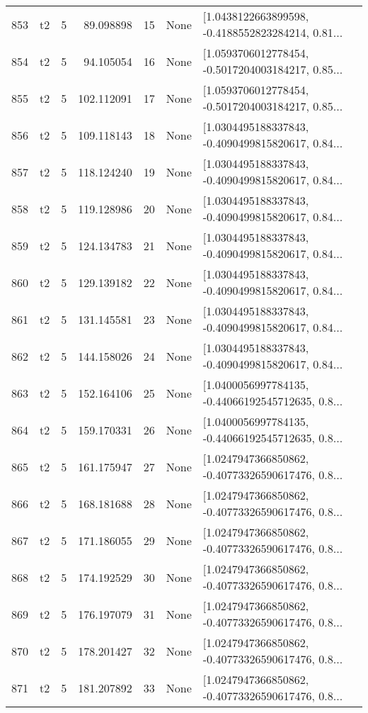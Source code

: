 \begin{tabular}{lllrlll}
853 &  t2 &   5 &    89.098898 &   15 &  None &  [1.0438122663899598, -0.4188552823284214, 0.81... \\
854 &  t2 &   5 &    94.105054 &   16 &  None &  [1.0593706012778454, -0.5017204003184217, 0.85... \\
855 &  t2 &   5 &   102.112091 &   17 &  None &  [1.0593706012778454, -0.5017204003184217, 0.85... \\
856 &  t2 &   5 &   109.118143 &   18 &  None &  [1.0304495188337843, -0.4090499815820617, 0.84... \\
857 &  t2 &   5 &   118.124240 &   19 &  None &  [1.0304495188337843, -0.4090499815820617, 0.84... \\
858 &  t2 &   5 &   119.128986 &   20 &  None &  [1.0304495188337843, -0.4090499815820617, 0.84... \\
859 &  t2 &   5 &   124.134783 &   21 &  None &  [1.0304495188337843, -0.4090499815820617, 0.84... \\
860 &  t2 &   5 &   129.139182 &   22 &  None &  [1.0304495188337843, -0.4090499815820617, 0.84... \\
861 &  t2 &   5 &   131.145581 &   23 &  None &  [1.0304495188337843, -0.4090499815820617, 0.84... \\
862 &  t2 &   5 &   144.158026 &   24 &  None &  [1.0304495188337843, -0.4090499815820617, 0.84... \\
863 &  t2 &   5 &   152.164106 &   25 &  None &  [1.0400056997784135, -0.44066192545712635, 0.8... \\
864 &  t2 &   5 &   159.170331 &   26 &  None &  [1.0400056997784135, -0.44066192545712635, 0.8... \\
865 &  t2 &   5 &   161.175947 &   27 &  None &  [1.0247947366850862, -0.40773326590617476, 0.8... \\
866 &  t2 &   5 &   168.181688 &   28 &  None &  [1.0247947366850862, -0.40773326590617476, 0.8... \\
867 &  t2 &   5 &   171.186055 &   29 &  None &  [1.0247947366850862, -0.40773326590617476, 0.8... \\
868 &  t2 &   5 &   174.192529 &   30 &  None &  [1.0247947366850862, -0.40773326590617476, 0.8... \\
869 &  t2 &   5 &   176.197079 &   31 &  None &  [1.0247947366850862, -0.40773326590617476, 0.8... \\
870 &  t2 &   5 &   178.201427 &   32 &  None &  [1.0247947366850862, -0.40773326590617476, 0.8... \\
871 &  t2 &   5 &   181.207892 &   33 &  None &  [1.0247947366850862, -0.40773326590617476, 0.8... \\

\end{tabular}
